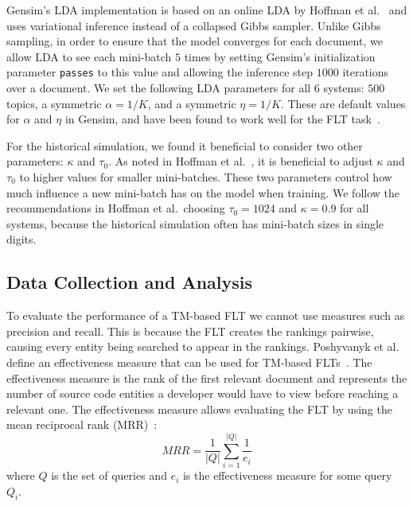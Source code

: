Gensim's LDA implementation is based on an online LDA by Hoffman et
al.~\cite{Hoffman-etal_2010} and uses variational inference instead of a
collapsed Gibbs sampler.  Unlike Gibbs sampling, in order to ensure that the
model converges for each document, we allow LDA to see each mini-batch $5$ times
by setting Gensim's initialization parameter \texttt{passes} to this value and
allowing the inference step $1000$ iterations over a document.  We set the
following LDA parameters for all 6 systems: $500$ topics, a symmetric
$\alpha=1/K$, and a symmetric $\eta=1/K$.  These are default values for $\alpha$
and $\eta$ in Gensim, and have been found to work well for the FLT
task~\cite{Biggers-etal_2014}.

For the historical simulation, we found it beneficial to consider two other
parameters: $\kappa$ and $\tau_0$.  As noted in Hoffman et
al.~\cite{Hoffman-etal_2010}, it is beneficial to adjust $\kappa$ and $\tau_0$
to higher values for smaller mini-batches.  These two parameters control how
much influence a new mini-batch has on the model when training.  We follow the
recommendations in Hoffman et al.\, choosing $\tau_0=1024$ and $\kappa=0.9$ for
all systems, because the historical simulation often has mini-batch sizes in
single digits.




\subsection{Data Collection and Analysis}
\label{sec:data}

To evaluate the performance of a TM-based FLT we cannot use measures such as
precision and recall.  This is because the FLT creates the rankings pairwise,
causing every entity being searched to appear in the rankings.  Poshyvanyk et
al. define an effectiveness measure that can be used for TM-based
FLTs~\cite{Poshyvanyk-etal_2007}.  The effectiveness measure is the rank of the
first relevant document and represents the number of source code entities a
developer would have to view before reaching a relevant one.  The effectiveness
measure allows evaluating the FLT by using the mean reciprocal rank
(MRR)~\cite{Voorhees_1999}:
\begin{equation}
    MRR = \frac{1}{|Q|} \sum_{i=1}^{|Q|} \frac{1}{e_i}
\end{equation}
where $Q$ is the set of queries and $e_i$ is the effectiveness measure for some
query $Q_i$.

